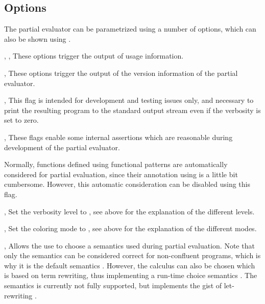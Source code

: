 \subsection{Options}

The partial evaluator can be parametrized using a number of options,
which can also be shown using .

\begin{description}
\item{, , }
These options trigger the output of usage information.

\item{, }
These options trigger the output of the version information
of the partial evaluator.

\item{, }
This flag is intended for development and testing issues only,
and necessary to print the resulting program to the standard output
stream even if the verbosity is set to zero.

\item{, }
These flags enable some internal assertions which are reasonable
during development of the partial evaluator.

\item{}
Normally, functions defined using functional patterns are automatically
considered for partial evaluation, since their annotation using 
is a little bit cumbersome.
However, this automatic consideration can be disabled using this flag.

\item{, }
Set the verbosity level to , see above for the explanation
of the different levels.

\item{, }
Set the coloring mode to , see above for the explanation
of the different modes.

\item{, }
Allows the use to choose a semantics used during partial evaluation.
Note that only the  semantics can be considered correct
for non-confluent programs, which is why it is the default semantics
\cite{Peemoeller2016}.
However, the  calculus can also be chosen which is based
on term rewriting, thus implementing a run-time choice semantics
\cite{AlbertHanusVidal02JFLP}.
The  semantics is currently not fully supported,
but implements the gist of let-rewriting \cite{Lopez-Fraguas07}.


\end{description}
